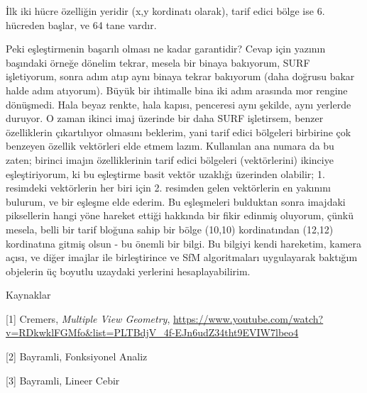 \documentclass[12pt,fleqn]{article}\usepackage{../../common}
\begin{document}
İlk iki hücre özelliğin yeridir (x,y kordinatı olarak), tarif edici bölge
ise 6. hücreden başlar, ve 64 tane vardır.

Peki eşleştirmenin başarılı olması ne kadar garantidir? Cevap için yazının
başındaki örneğe dönelim tekrar, mesela bir binaya bakıyorum, SURF
işletiyorum, sonra adım atıp aynı binaya tekrar bakıyorum (daha doğrusu
bakar halde adım atıyorum). Büyük bir ihtimalle bina iki adım arasında mor
rengine dönüşmedi. Hala beyaz renkte, hala kapısı, penceresi aynı şekilde,
aynı yerlerde duruyor. O zaman ikinci imaj üzerinde bir daha SURF
işletirsem, benzer özelliklerin çıkartılıyor olmasını beklerim, yani tarif
edici bölgeleri birbirine çok benzeyen özellik vektörleri elde etmem
lazım. Kullanılan ana numara da bu zaten; birinci imajın özelliklerinin
tarif edici bölgeleri (vektörlerini) ikinciye eşleştiriyorum, ki bu
eşleştirme basit vektör uzaklığı üzerinden olabilir; 1. resimdeki
vektörlerin her biri için 2. resimden gelen vektörlerin en yakınını
bulurum, ve bir eşleşme elde ederim. Bu eşleşmeleri bulduktan sonra
imajdaki piksellerin hangi yöne hareket ettiği hakkında bir fikir edinmiş
oluyorum, çünkü mesela, belli bir tarif bloğuna sahip bir bölge (10,10)
kordinatından (12,12) kordinatına gitmiş olsun - bu önemli bir bilgi. Bu
bilgiyi kendi hareketim, kamera açısı, ve diğer imajlar ile birleştirince
ve SfM algoritmaları uygulayarak baktığım objelerin üç boyutlu uzaydaki
yerlerini hesaplayabilirim.

Kaynaklar

[1] Cremers, {\em Multiple View Geometry}, \url{https://www.youtube.com/watch?v=RDkwklFGMfo&list=PLTBdjV_4f-EJn6udZ34tht9EVIW7lbeo4}

[2] Bayramli, Fonksiyonel Analiz

[3] Bayramli, Lineer Cebir
\end{document}
